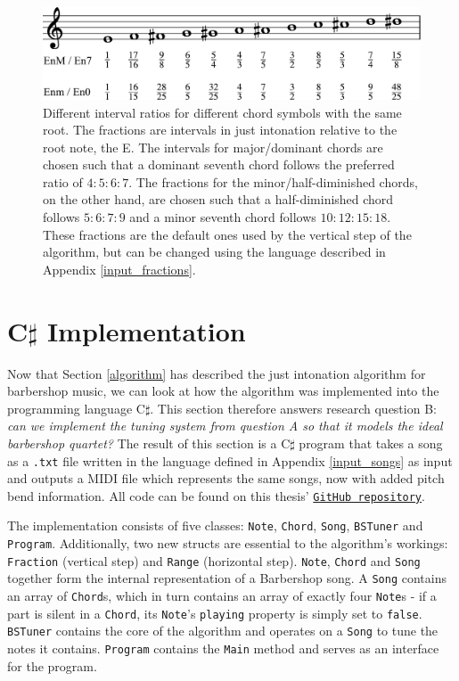 \documentclass[a4paper]{article}
\begin{document}
\begin{figure}
	\centering
	\includegraphics[width=\textwidth]{Figures/fractions.pdf}
	\caption{Different interval ratios for different chord symbols with the same root. The fractions are intervals in just intonation relative to the root note, the E. The intervals for major/dominant chords are chosen such that a dominant seventh chord follows the preferred ratio of $4:5:6:7$. \cite{van_de_craats_fis_1989} The fractions for the minor/half-diminished chords, on the other hand, are chosen such that a half-diminished chord follows $5:6:7:9$ and a minor seventh chord follows $10:12:15:18$. \cite{van_de_craats_fis_1989} These fractions are the default ones used by the vertical step of the algorithm, but can be changed using the language described in Appendix \ref{input_fractions}.}
	\label{fig:fractions}
\end{figure}

\section{C$\sharp$ Implementation}
\label{implementation}
Now that Section \ref{algorithm} has described the just intonation algorithm for barbershop music, we can look at how the algorithm was implemented into the programming language C$\sharp$. This section therefore answers research question B: {\it can we implement the tuning system from question A so that it models the ideal barbershop quartet?} The result of this section is a C$\sharp$ program that takes a song as a \texttt{.txt} file written in the language defined in Appendix \ref{input_songs} as input and outputs a MIDI file which represents the same songs, now with added pitch bend information. All code can be found on this thesis' \texttt{\href{https://GitHub.com/teuncb/AdaptiveBarbershop}{GitHub repository}}.

The implementation consists of five classes: \texttt{Note}, \texttt{Chord}, \texttt{Song}, \texttt{BSTuner} and \texttt{Program}. Additionally, two new structs are essential to the algorithm's workings: \texttt{Fraction} (vertical step) and \texttt{Range} (horizontal step). \texttt{Note}, \texttt{Chord} and \texttt{Song} together form the internal representation of a Barbershop song. A \texttt{Song} contains an array of \texttt{Chord}s, which in turn contains an array of exactly four \texttt{Note}s - if a part is silent in a \texttt{Chord}, its \texttt{Note}'s \texttt{playing} property is simply set to \texttt{false}. \texttt{BSTuner} contains the core of the algorithm and operates on a \texttt{Song} to tune the notes it contains. \texttt{Program} contains the \texttt{Main} method and serves as an interface for the program.
\end{document}
